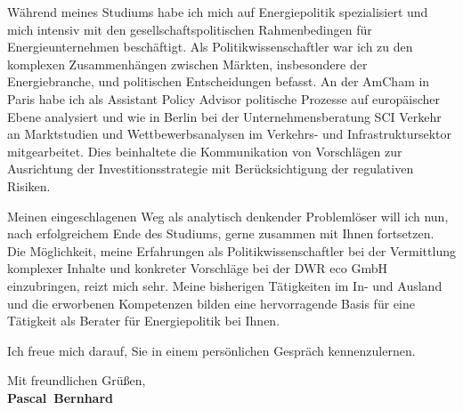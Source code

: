 \documentclass[11pt,a4paper]{article}
\def\firstname{Pascal}
\def\familyname{Bernhard}
\begin{document}
Während meines Studiums habe ich mich auf Energiepolitik spezialisiert und mich intensiv mit den gesellschaftspolitischen Rahmenbedingen für Energieunternehmen beschäftigt. Als Politikwissenschaftler war ich zu den komplexen Zusammenhängen zwischen Märkten, insbesondere der Energiebranche, und politischen Entscheidungen befasst. An der AmCham in Paris habe ich als Assistant Policy Advisor politische Prozesse auf europäischer Ebene analysiert und wie in Berlin bei der Unternehmensberatung SCI Verkehr an Marktstudien und Wettbewerbsanalysen im Verkehrs- und Infrastruktursektor mitgearbeitet. Dies beinhaltete die Kommunikation von Vorschlägen zur Ausrichtung der Investitionsstrategie mit Berücksichtigung der regulativen Risiken.


Meinen eingeschlagenen Weg als analytisch denkender Problemlöser will ich nun, nach erfolgreichem Ende des Studiums, gerne zusammen mit Ihnen fortsetzen.
Die Möglichkeit, meine Erfahrungen als Politikwissenschaftler bei der Vermittlung komplexer Inhalte und konkreter Vorschläge bei der DWR eco GmbH einzubringen, reizt mich sehr. Meine bisherigen Tätigkeiten im In- und Ausland und die erworbenen Kompetenzen bilden eine hervorragende Basis für eine Tätigkeit als Berater für Energiepolitik bei Ihnen.


Ich freue mich darauf, Sie in einem persönlichen Gespräch kennenzulernen.

  
Mit freundlichen Grüßen,\\[3em] %
%
{\bfseries \firstname~\familyname}\\
%
\end{document}
